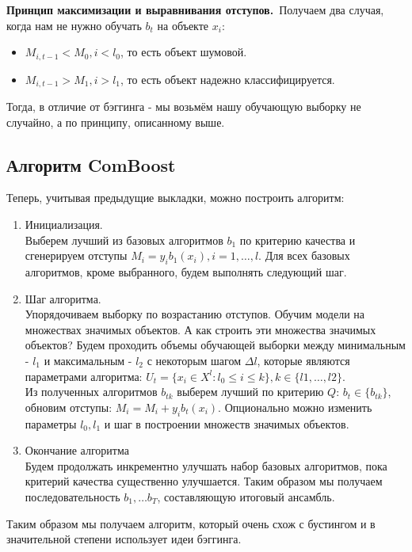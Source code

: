 \textbf{Принцип максимизации и выравнивания отступов.}\
Получаем два случая, когда нам не нужно обучать $b_t$ на объекте $x_i$: \\
\begin{itemize}
    \item $M_{i,t-1} < M_0, i<l_0$, то есть объект шумовой.
    \item $M_{i,t-1} > M_1, i>l_1$, то есть объект надежно классифицируется.
\end{itemize}
    
Тогда, в отличие от бэггинга - мы возьмём нашу обучающую выборку не случайно, а по принципу, описанному выше. \\
    
\subsection{Алгоритм ComBoost}

Теперь, учитывая предыдущие выкладки, можно построить алгоритм:
\begin{enumerate}
    \item Инициализация. \\
    Выберем лучший из базовых алгоритмов $b_1$ по критерию качества и сгенерируем отступы $M_i = y_ib_1(x_i), i=1,\dots,l$. Для всех базовых алгоритмов, кроме выбранного, будем выполнять следующий шаг.
    \item Шаг алгоритма. \\
    Упорядочиваем выборку по возрастанию отступов. Обучим модели на множествах значимых объектов. А как строить эти множества значимых объектов? Будем проходить объемы обучающей выборки между минимальным - $l_1$ и максимальным - $l_2$ с некоторым шагом $\Delta l$, которые являются параметрами алгоритма: $U_t = \{x_i \in X^l : l_0 \leq i \leq k\}, k \in \{l1, \dots, l2\}$. \\
    Из полученных алгоритмов $b_{tk}$ выберем лучший по критерию $Q$: $b_t \in \{b_{tk}\}$, обновим отступы: $M_i = M_i + y_i b_t(x_i)$. Опционально можно изменить параметры $l_0, l_1$ и шаг в построении множеств значимых объектов.
    \item Окончание алгоритма \\
    Будем продолжать инкрементно улучшать набор базовых алгоритмов, пока критерий качества существенно улучшается.
    Таким образом мы получаем последовательность $b_1, \dots b_T$, составляющую итоговый ансамбль.
\end{enumerate}
    
Таким образом мы получаем алгоритм, который очень схож с бустингом и в значительной степени использует идеи бэггинга. \\
    
